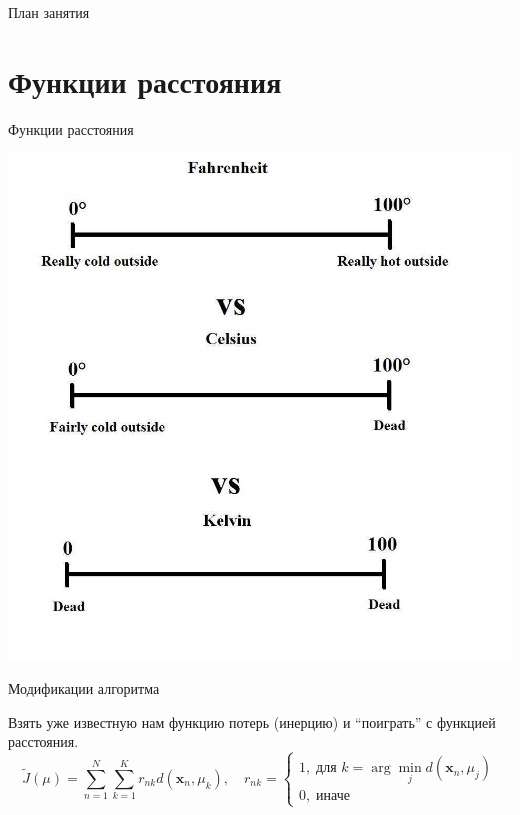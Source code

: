 \documentclass[aspectratio=169]{beamer}
\begin{document}
\begin{frame}{План занятия}
\tableofcontents
\end{frame}


\section{Функции расстояния}


\begin{frame}

\begin{center}
{\Large Функции расстояния}

\vspace{1em}
\includegraphics[height=0.8\textheight]{images/celsius.jpg}
\end{center}

\end{frame}

\begin{frame}{Модификации алгоритма}

Взять уже известную нам функцию потерь (инерцию) и ``поиграть'' с функцией расстояния. 
\[
\tilde J(\mu) = \sum_{n=1}^N \sum_{k=1}^K r_{nk} d(\mathbf{x}_n, \mu_k), \quad r_{nk} = \begin{cases}
1, \; \text{для } k = \arg \min_j d(\mathbf{x}_n, \mu_j) \\
0, \; \text{иначе}
\end{cases}
\]
\end{frame}
\end{document}
